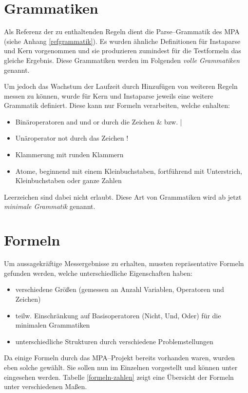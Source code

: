 \documentclass[ngerman,a4paper,abstracton,open=right,twoside=false,toc=listofnumbered,bibtotocnumbered]{scrreprt}
\begin{document}
\section{Grammatiken}

Als Referenz der zu enthaltenden Regeln dient die Parse--Grammatik des MPA (siehe Anhang \ref{refgrammatik}). Es wurden ähnliche Definitionen für Instaparse und Kern vorgenommen und sie produzieren zumindest für die Testformeln das gleiche Ergebnis. Diese Grammatiken werden im Folgenden \emph{volle Grammatiken} genannt.

Um jedoch das Wachstum der Laufzeit durch Hinzufügen von weiteren Regeln messen zu können, wurde für Kern und Instaparse jeweils eine weitere Grammatik definiert. Diese kann nur Formeln verarbeiten, welche enhalten:

\begin{itemize}
	\item Binäroperatoren \glqq{}and\grqq{} und \glqq{}or\grqq{} durch die Zeichen \glqq{}\&\grqq{} bzw. \glqq{}|\grqq
	\item Unäroperator \glqq{}not\grqq{} durch das Zeichen \glqq{}!\grqq
	\item Klammerung mit runden Klammern
	\item Atome, beginnend mit einem Kleinbuchstaben, fortführend mit Unterstrich, Kleinbuchstaben oder ganze Zahlen
\end{itemize}

Leerzeichen sind dabei nicht erlaubt. Diese Art von Grammatiken wird ab jetzt \emph{minimale Grammatik} genannt.

\section{Formeln}

Um aussagekräftige Messergebnisse zu erhalten, mussten repräsentative Formeln gefunden werden, welche unterschiedliche Eigenschaften haben:

\begin{itemize}
	\item verschiedene Größen (gemessen an Anzahl Variablen, Operatoren und Zeichen)
	\item teilw. Einschränkung auf Basisoperatoren (Nicht, Und, Oder) für die minimalen Grammatiken
	\item unterschiedliche Strukturen durch verschiedene Problemstellungen
\end{itemize}

Da einige Formeln durch das MPA--Projekt bereits vorhanden waren, wurden eben solche gewählt. Sie sollen nun im Einzelnen vorgestellt und können unter \cite{lw-formeln} eingesehen werden. Tabelle \ref{formeln-zahlen} zeigt eine Übersicht der Formeln unter verschiedenen Maßen.
\end{document}
